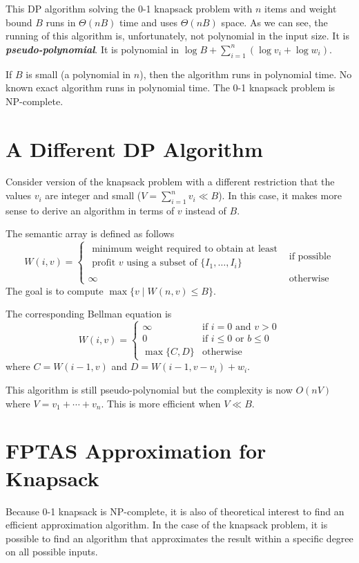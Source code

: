 This DP algorithm solving the 0-1 knapsack problem with $n$ items and weight bound $B$ runs in $\Theta(nB)$ time and uses $\Theta(nB)$ space. As we can see, the running of this algorithm is, unfortunately, not polynomial in the input size. It is \textit{\textbf{pseudo-polynomial}}. It is polynomial in $\log B + \sum_{i=1}^n (\log v_i + \log w_i)$.

If $B$ is small (a polynomial in $n$), then the algorithm runs in polynomial time. No known exact algorithm runs in polynomial time. The 0-1 knapsack problem is NP-complete.

\section{A Different DP Algorithm}

Consider version of the knapsack problem with a different restriction that the values $v_i$ are integer and small ($V=\sum_{i=1}^n v_i \ll B$). In this case, it makes more sense to derive an algorithm in terms of $v$ instead of $B$.

The semantic array is defined as follows
$$
W(i,v) = \begin{cases}
    \substack{\text{minimum weight required to obtain at least} \\ \text{profit $v$ using a subset of $\{I_1,\ldots,I_i\}$}} & \text{if possible} \\
    \infty & \text{otherwise}
\end{cases}
$$
The goal is to compute $\max\{v \mid W(n,v) \leq B\}$.

The corresponding Bellman equation is
$$
W(i,v) = \begin{cases}
    \infty & \text{if $i=0$ and $v>0$} \\
    0 & \text{if $i\leq 0$ or $b\leq 0$} \\
    \max\{C,D\} & \text{otherwise}
\end{cases}
$$
where $C = W(i-1,v)$ and $D=W(i-1,v-v_i) + w_i$.

This algorithm is still pseudo-polynomial but the complexity is now $O(nV)$ where $V = v_1 + \cdots + v_n$. This is more efficient when $V \ll B$.

\section{FPTAS Approximation for Knapsack}

Because 0-1 knapsack is NP-complete, it is also of theoretical interest to find an efficient approximation algorithm. In the case of the knapsack problem, it is possible to find an algorithm that approximates the result within a specific degree on all possible inputs.

